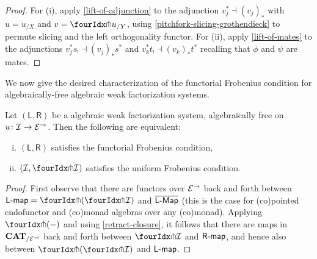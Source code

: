 \documentclass[reqno,10pt,a4paper,oneside,draft]{amsart}
\newcommand{\LL}{\mathsf{L}}
\newcommand{\RR}{\mathsf{R}}
\begin{document}
{{\begin{proof} For (i), apply \cref{lift-of-adjunction} to the adjunction $v_j^* \dashv (v_j)_*$ with $u = u_{/X}$ and $v = {\liftr{u}}_{/Y}$, using \cref{pitchfork-slicing-grothendieck} to permute slicing and the left orthogonality functor. For (ii), apply \cref{lift-of-mates} to  
the adjunctions $v_j^* s_! \dashv (v_j)_* s^*$ and $v_k^* t_! \dashv (v_k)_* t^*$ recalling that $\phi$ and $\psi$ are mates.
\end{proof}




We now give the desired characterization of the functorial Frobenius condition for algebraically-free algebraic weak factorization systems.




\begin{theorem} \label{thm:frobenius-comparison}
Let $(\LL, \RR)$ be a algebraic weak factorization system, algebraically free on $u \co \cal{I} \to \cal{E}^\to$. Then the following
are equivalent:
\begin{enumerate}[(i)] 
\item  $(\LL, \RR)$ satisfies the functorial Frobenius condition,
\item $(\cal{I}, \liftr{\cal{I}})$ satisfies the uniform Frobenius condition.
\end{enumerate}
\end{theorem}

\begin{proof} First observe that there are functors over $\cal{E}^\to$ back and forth between $\pcoalg{\LL} = \liftl{(\liftr{\cal{I}})}$ and $\overline{\pCoalg{\LL}}$ (this is the case for (co)pointed endofunctor and (co)monad algebras over any (co)monad).
Applying $\liftr{(-)}$ and using \cref{retract-closure}, it follows that there are maps in $\CAT_{/\cal{E}^\to}$ back and forth between $\liftr{\cal{I}}$ and $\palg{\RR}$, and hence also between $\liftl{(\liftr{\cal{I}})}$ and $\pcoalg{\LL}$.


\end{proof}}}
\end{document}
